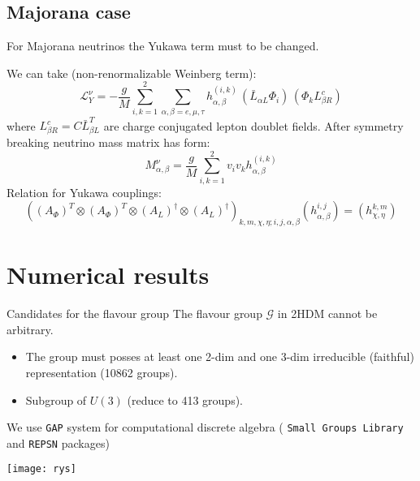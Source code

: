\documentclass{beamer}
\begin{document}
\subsection{Majorana case}

\begin{frame}

For \alert{Majorana neutrinos} the Yukawa term must to be changed. 

We can take (non-renormalizable Weinberg term): 
$$\mathcal{L}^\nu_Y=-\frac{g}{M}\sum_{i,k=1}^2 \sum_{\alpha,\beta = e,\mu,\tau} h^{(i,k)}_{\alpha,\beta} \,(\bar{L}_{\alpha L}\Phi_i) \,(\Phi_k L^c_{\beta R})$$
where $L_{\beta R}^c = C\bar{L}^T_{\beta L}$ are charge conjugated lepton doublet fields. 
After symmetry breaking neutrino mass matrix has form: 
$$M^\nu_{\alpha, \beta}=\frac{g}{M} \sum_{i,k=1}^2 v_iv_k h_{\alpha,\beta}^{(i,k)}$$
Relation for Yukawa couplings:
$$((A_\Phi)^T\otimes (A_\Phi)^T\otimes (A_L)^\dag \otimes (A_L)^\dag)_{k,m,\chi,\eta;i,j,\alpha,\beta}(h^{i,j}_{\alpha,\beta})=(h^{k,m}_{\chi,\eta}) $$
\end{frame}

\section{Numerical results}
\begin{frame}{Candidates for the flavour group}
The flavour group $\mathcal{G}$ in 2HDM cannot be arbitrary.
\begin{itemize}
\item The group must posses at least \alert{one 2-dim} and \alert{one 3-dim} irreducible (faithful) representation (10862 groups).
\item Subgroup of $U(3)$ (reduce to 413 groups).
\end{itemize}

We use \texttt{GAP} system for computational discrete algebra ( \texttt{Small Groups Library} and \texttt{REPSN} packages)
\end{frame}

\begin{frame}

\texttt{[image: rys]}

\end{frame}
\end{document}
